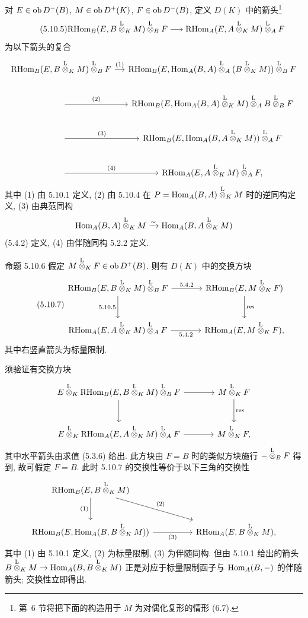 对 $E\in\operatorname{ob} D^-(B)$, $M\in\operatorname{ob} D^+(K)$, $F\in\operatorname{ob} D^-(B)$, 定义 $D(K)$ 中的箭头\footnote{第~6 节将把下面的构造用于 $M$ 为对偶化复形的情形 (6.7).}
\begin{equation}\tag{5.10.5}
\mathrm{RHom}_B(E,B\overset{\mathrm L}{\otimes}_KM)\overset{\mathrm L}{\otimes}_BF\longrightarrow\mathrm{RHom}_A(E,A\overset{\mathrm L}{\otimes}_KM)\overset{\mathrm L}{\otimes}_AF
\end{equation}
为以下箭头的复合
\[
\begin{tikzcd}[column sep=small]
\RHom_B(E,B\lten_KM)\lten_BF \arrow[r,"(1)"] & \RHom_B(E,\Hom_A(B,A)\lten_A(B\lten_KM))\lten_BF \\
\arrow[r,"(2)"] & \RHom_B(E,\Hom_A(B,A)\lten_KM)\lten_A B\lten_BF \\
\arrow[r,"(3)"] & \RHom_B(E,\Hom_A(B,A\lten_KM))\lten_AF \\
\arrow[r,"(4)"] & \RHom_A(E,A\lten_KM)\lten_AF,
\end{tikzcd}
\]
其中 (1) 由 5.10.1 定义, (2) 由 5.10.4 在 $P=\operatorname{Hom}_A(B,A)\overset{\mathrm L}{\otimes}_KM$ 时的逆同构定义, (3) 由典范同构
\[
\operatorname{Hom}_A(B,A)\overset{\mathrm L}{\otimes}_KM\xrightarrow{\sim}\operatorname{Hom}_A(B,A\overset{\mathrm L}{\otimes}_KM)
\]
(5.4.2) 定义, (4) 由伴随同构 5.2.2 定义.

\begin{statement}{命题 5.10.6}
假定 $M\overset{\mathrm L}{\otimes}_KF\in\operatorname{ob} D^+(B)$. 则有 $D(K)$ 中的交换方块
\begin{equation}\tag{5.10.7}
\begin{tikzcd}[column sep=large,row sep=large]
\RHom_B(E,B\lten_KM)\lten_BF \arrow[r,"5.4.2"] \arrow[d,"5.10.5"'] & \RHom_B(E,M\lten_KF) \arrow[d,"\mathrm{res}"]\\
\RHom_A(E,A\lten_KM)\lten_AF \arrow[r,"5.4.2"'] & \RHom_A(E,M\lten_KF),
\end{tikzcd}
\end{equation}
其中右竖直箭头为标量限制.
\end{statement}

须验证有交换方块
\[
\begin{tikzcd}[column sep=large,row sep=large]
E\lten_K\RHom_B(E,B\lten_KM)\lten_BF \arrow[r] \arrow[d] & M\lten_KF \arrow[d,"\mathrm{res}"]\\
E\lten_K\RHom_A(E,A\lten_KM)\lten_AF \arrow[r] & M\lten_KF,
\end{tikzcd}
\]
其中水平箭头由求值 (5.3.6) 给出. 此方块由 $F=B$ 时的类似方块施行 $-\overset{\mathrm L}{\otimes}_BF$ 得到, 故可假定 $F=B$. 此时 5.10.7 的交换性等价于以下三角的交换性
\[
\begin{tikzcd}[column sep=huge,row sep=large]
\RHom_B(E,B\lten_KM) \arrow[d,"(1)"'] \arrow[dr,"(2)"] & \\
\RHom_B(E,\Hom_A(B,B\lten_KM)) \arrow[r,"(3)"'] & \RHom_A(E,B\lten_KM),
\end{tikzcd}
\]
其中 (1) 由 5.10.1 定义, (2) 为标量限制, (3) 为伴随同构. 但由 5.10.1 给出的箭头 $B\overset{\mathrm L}{\otimes}_KM\to\operatorname{Hom}_A(B,B\overset{\mathrm L}{\otimes}_KM)$ 正是对应于标量限制函子与 $\operatorname{Hom}_A(B,-)$ 的伴随箭头; 交换性立即得出.

